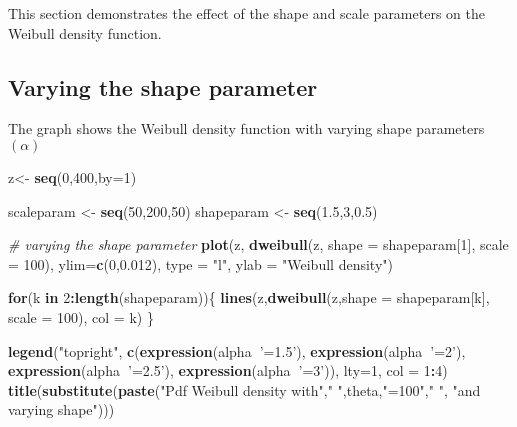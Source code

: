 \documentclass[]{book}
\newenvironment{Shaded}{\begin{snugshade}}{\end{snugshade}}
\newcommand{\KeywordTok}[1]{\textcolor[rgb]{0.13,0.29,0.53}{\textbf{#1}}}
\newcommand{\DataTypeTok}[1]{\textcolor[rgb]{0.13,0.29,0.53}{#1}}
\newcommand{\DecValTok}[1]{\textcolor[rgb]{0.00,0.00,0.81}{#1}}
\newcommand{\FloatTok}[1]{\textcolor[rgb]{0.00,0.00,0.81}{#1}}
\newcommand{\StringTok}[1]{\textcolor[rgb]{0.31,0.60,0.02}{#1}}
\newcommand{\CommentTok}[1]{\textcolor[rgb]{0.56,0.35,0.01}{\textit{#1}}}
\newcommand{\ControlFlowTok}[1]{\textcolor[rgb]{0.13,0.29,0.53}{\textbf{#1}}}
\newcommand{\OperatorTok}[1]{\textcolor[rgb]{0.81,0.36,0.00}{\textbf{#1}}}
\newcommand{\NormalTok}[1]{#1}
\theoremstyle{definition}
\theoremstyle{definition}
\theoremstyle{definition}
\theoremstyle{remark}
\begin{document}
This section demonstrates the effect of the shape and scale parameters
on the Weibull density function.

\subsection{Varying the shape
parameter}\label{varying-the-shape-parameter-2}

The graph shows the Weibull density function with varying shape
parameters \((\alpha)\)

\begin{Shaded}
\begin{Highlighting}[]
\NormalTok{z<-}\StringTok{ }\KeywordTok{seq}\NormalTok{(}\DecValTok{0}\NormalTok{,}\DecValTok{400}\NormalTok{,}\DataTypeTok{by=}\DecValTok{1}\NormalTok{)}

\NormalTok{scaleparam <-}\StringTok{ }\KeywordTok{seq}\NormalTok{(}\DecValTok{50}\NormalTok{,}\DecValTok{200}\NormalTok{,}\DecValTok{50}\NormalTok{)}
\NormalTok{shapeparam <-}\StringTok{ }\KeywordTok{seq}\NormalTok{(}\FloatTok{1.5}\NormalTok{,}\DecValTok{3}\NormalTok{,}\FloatTok{0.5}\NormalTok{)}

\CommentTok{# varying the shape parameter}
\KeywordTok{plot}\NormalTok{(z, }\KeywordTok{dweibull}\NormalTok{(z, }\DataTypeTok{shape =}\NormalTok{ shapeparam[}\DecValTok{1}\NormalTok{], }\DataTypeTok{scale =} \DecValTok{100}\NormalTok{), }\DataTypeTok{ylim=}\KeywordTok{c}\NormalTok{(}\DecValTok{0}\NormalTok{,}\FloatTok{0.012}\NormalTok{), }\DataTypeTok{type =} \StringTok{"l"}\NormalTok{, }\DataTypeTok{ylab =} \StringTok{"Weibull density"}\NormalTok{)}

\ControlFlowTok{for}\NormalTok{(k }\ControlFlowTok{in} \DecValTok{2}\OperatorTok{:}\KeywordTok{length}\NormalTok{(shapeparam))\{}
  \KeywordTok{lines}\NormalTok{(z,}\KeywordTok{dweibull}\NormalTok{(z,}\DataTypeTok{shape =}\NormalTok{ shapeparam[k], }\DataTypeTok{scale =} \DecValTok{100}\NormalTok{), }\DataTypeTok{col =}\NormalTok{ k)}
\NormalTok{\}}

\KeywordTok{legend}\NormalTok{(}\StringTok{"topright"}\NormalTok{,  }\KeywordTok{c}\NormalTok{(}\KeywordTok{expression}\NormalTok{(alpha}\OperatorTok{~}\StringTok{'=1.5'}\NormalTok{), }\KeywordTok{expression}\NormalTok{(alpha}\OperatorTok{~}\StringTok{'=2'}\NormalTok{), }\KeywordTok{expression}\NormalTok{(alpha}\OperatorTok{~}\StringTok{'=2.5'}\NormalTok{), }\KeywordTok{expression}\NormalTok{(alpha}\OperatorTok{~}\StringTok{'=3'}\NormalTok{)), }\DataTypeTok{lty=}\DecValTok{1}\NormalTok{, }\DataTypeTok{col =} \DecValTok{1}\OperatorTok{:}\DecValTok{4}\NormalTok{)}
\KeywordTok{title}\NormalTok{(}\KeywordTok{substitute}\NormalTok{(}\KeywordTok{paste}\NormalTok{(}\StringTok{"Pdf Weibull density with"}\NormalTok{,}\StringTok{" "}\NormalTok{,theta,}\StringTok{"=100"}\NormalTok{,}\StringTok{" "}\NormalTok{, }\StringTok{"and varying shape"}\NormalTok{)))}
\end{Highlighting}
\end{Shaded}
\end{document}
